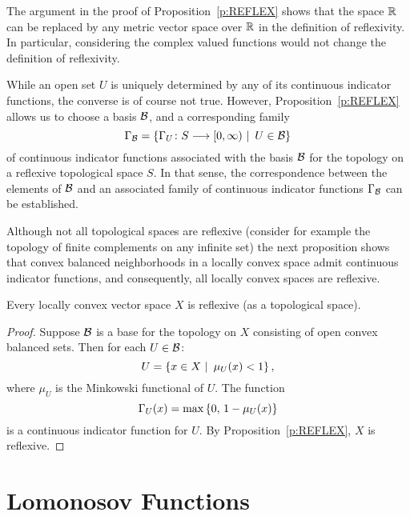 \smallskip

\begin{rem}
The argument in the proof of Proposition~\ref{p:REFLEX} shows
that the space $\mathbb R$ can be replaced by any metric vector
space over $\mathbb R$ in the definition of reflexivity. In
particular, considering the complex valued functions would not
change the definition of reflexivity.
\end{rem}

\smallskip
\goodbreak

\begin{rem}
While an open set $U$ is uniquely determined by any of its
continuous indicator functions, the converse is of course not
true. However, Proposition~\ref{p:REFLEX} allows us to choose a
basis $\cal B$, and a corresponding family
\[ \Gamma_{\cal B}=\left\{\Gamma_U\colon S\longrightarrow [0,\infty)
           \,\,|\,\,\, U\in\cal B\right\} \]
of continuous indicator functions associated with the basis
$\cal B$ for the topology on a reflexive topological space $S$.
In that sense, the correspondence between the elements of $\cal
B$ and an associated family of continuous indicator functions
$\Gamma_{\cal B}$ can be established.
\end{rem}

\medskip

Although not all topological spaces are reflexive (consider for
example the topology of finite complements on any infinite set)
the next proposition shows that convex balanced neighborhoods
in a locally convex space admit continuous indicator functions,
and consequently, all locally convex spaces are reflexive.

\smallskip

\begin{prop}
Every locally convex vector space $X$ is reflexive (as a
topological space).
\end{prop}

\begin{proof}
Suppose $\cal B$ is a base for the topology on $X$ consisting
of open convex balanced sets. Then for each $U\in\cal{B}$:
\[ U = \left\{x \in X \,\,|\,\,\, \mu_U(x) < 1\right\}, \]
where $\mu_U$ is the Minkowski functional of $U$. The function
\[ \Gamma_U(x) =\max\left\{0, \, 1-\mu_U(x)\right\} \]
is a continuous indicator function for $U$. By
Proposition~\ref{p:REFLEX}, $X$ is reflexive.
\end{proof}

\goodbreak
\section{Lomonosov Functions}

